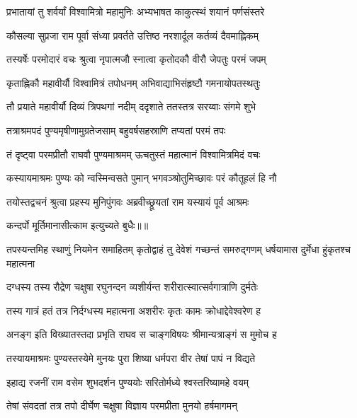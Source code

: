 
\twolineshloka
{प्रभातायां तु शर्वर्यां विश्वामित्रो महामुनिः}
{अभ्यभाषत काकुत्स्थं शयानं पर्णसंस्तरे} %

\twolineshloka
{कौसल्या सुप्रजा राम पूर्वा संध्या प्रवर्तते}
{उत्तिष्ठ नरशार्दूल कर्तव्यं दैवमाह्निकम्} %

\twolineshloka
{तस्यर्षेः परमोदारं वचः श्रुत्वा नृपात्मजौ}
{स्नात्वा कृतोदकौ वीरौ जेपतुः परमं जपम्} %

\twolineshloka
{कृताह्निकौ महावीर्यौ विश्वामित्रं तपोधनम्}
{अभिवाद्याभिसंहृष्टौ गमनायोपतस्थतुः} %

\twolineshloka
{तौ प्रयाते महावीर्यौ दिव्यं त्रिपथगां नदीम्}
{ददृशाते ततस्तत्र सरय्वाः संगमे शुभे} %

\twolineshloka
{तत्राश्रमपदं पुण्यमृषीणामुग्रतेजसाम्}
{बहुवर्षसहस्राणि तप्यतां परमं तपः} %

\twolineshloka
{तं दृष्ट्वा परमप्रीतौ राघवौ पुण्यमाश्रमम्}
{ऊचतुस्तं महात्मानं विश्वामित्रमिदं वचः} %

\twolineshloka
{कस्यायमाश्रमः पुण्यः को न्वस्मिन्वसते पुमान्}
{भगवञ्श्रोतुमिच्छावः परं कौतूहलं हि नौ} %

\twolineshloka
{तयोस्तद्वचनं श्रुत्वा प्रहस्य मुनिपुंगवः}
{अब्रवीच्छ्रूयतां राम यस्यायं पूर्व आश्रमः} %

{कन्दर्पो मूर्तिमानासीत्काम इत्युच्यते बुधैः॥॥} %

\addtocounter{shlokacount}{1}

\threelineshloka
{तपस्यन्तमिह स्थाणुं नियमेन समाहितम्}
{कृतोद्वाहं तु देवेशं गच्छन्तं समरुद्गणम्}
{धर्षयामास दुर्मेधा हुंकृतश्च महात्मना} %

\twolineshloka
{दग्धस्य तस्य रौद्रेण चक्षुषा रघुनन्दन}
{व्यशीर्यन्त शरीरात्स्वात्सर्वगात्राणि दुर्मतेः} %

\twolineshloka
{तस्य गात्रं हतं तत्र निर्दग्धस्य महात्मना}
{अशरीरः कृतः कामः क्रोधाद्देवेश्वरेण ह} %

\twolineshloka
{अनङ्ग इति विख्यातस्तदा प्रभृति राघव}
{स चाङ्गविषयः श्रीमान्यत्राङ्गं स मुमोच ह} %

\twolineshloka
{तस्यायमाश्रमः पुण्यस्तस्येमे मुनयः पुरा}
{शिष्या धर्मपरा वीर तेषां पापं न विद्यते} %

\twolineshloka
{इहाद्य रजनीं राम वसेम शुभदर्शन}
{पुण्ययोः सरितोर्मध्ये श्वस्तरिष्यामहे वयम्} %

\twolineshloka
{तेषां संवदतां तत्र तपो दीर्घेण चक्षुषा}
{विज्ञाय परमप्रीता मुनयो हर्षमागमन्} %

